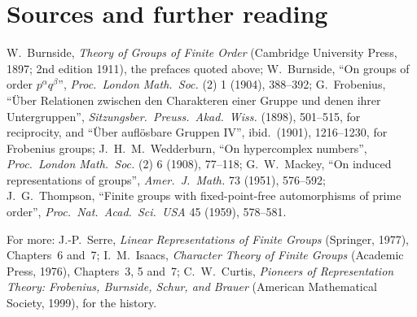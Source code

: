 \section*{Sources and further reading}

W.~Burnside, \emph{Theory of Groups of Finite Order} (Cambridge University Press, 1897; 2nd edition 1911), the prefaces quoted above; W.~Burnside, ``On groups of order $p^\alpha q^\beta$'', \emph{Proc.\ London Math.\ Soc.} (2) 1
(1904), 388--392; G.~Frobenius, ``Über Relationen zwischen den Charakteren einer Gruppe und denen ihrer Untergruppen'', \emph{Sitzungsber.\ Preuss.\ Akad.\ Wiss.} (1898), 501--515, for reciprocity, and ``Über auflösbare Gruppen
IV'', ibid.\ (1901), 1216--1230, for Frobenius groups; J.~H.~M.~Wedderburn, ``On hypercomplex numbers'', \emph{Proc.\ London Math.\ Soc.} (2) 6 (1908), 77--118; G.~W.~Mackey, ``On induced representations of groups'', \emph{Amer.\ J.\ Math.} 73
(1951), 576--592; J.~G.~Thompson, ``Finite groups with fixed-point-free automorphisms of prime order'', \emph{Proc.\ Nat.\ Acad.\ Sci.\ USA} 45 (1959), 578--581.

For more: J.-P.~Serre, \emph{Linear Representations of Finite Groups} (Springer, 1977), Chapters~6 and~7; I.~M.~Isaacs, \emph{Character Theory of Finite Groups} (Academic Press, 1976), Chapters~3, 5 and~7; C.~W.~Curtis,
\emph{Pioneers of Representation Theory: Frobenius, Burnside, Schur, and Brauer} (American Mathematical Society, 1999), for the history.
